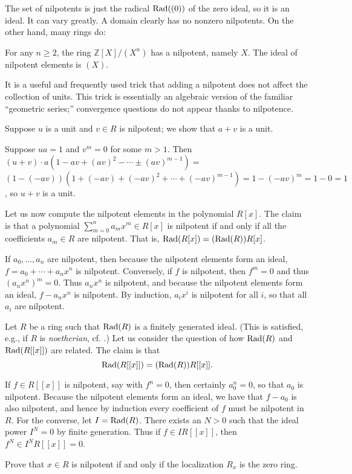 The set of nilpotents is just the radical $\operatorname{Rad}((0))$ of the zero ideal, so it
is an ideal. It can vary greatly. 
A domain clearly has no nonzero nilpotents. On the other hand, many rings do:

\begin{example} 
For any $n \geq 2$, the ring $\mathbb{Z}[X]/(X^n)$ has a nilpotent, namely $X$.
The ideal of nilpotent elements is $(X)$.
\end{example} 

It is a useful and frequently used trick that adding a nilpotent does not affect
the collection of units. This trick is essentially an algebraic version of the
familiar ``geometric series;'' convergence questions do not appear thanks to
nilpotence. 

\begin{example} 
Suppose $u$ is a unit and $v \in R$ is nilpotent; we show that $a+v$ is a unit.

Suppose $ua=1$ and $v^m=0$ for some
$m>1$. Then  $(u+v)\cdot a(1-av+(av)^2-\cdots\pm(av)^{m-1})=$
$(1-(-av))(1+(-av)+(-av)^2+\cdots+(-av)^{m-1})=1-(-av)^m=1-0=1$, so $u+v$
is a unit.
\end{example} 

\begin{example}
Let us now compute the nilpotent elements in the polynomial $R[x]$.
The claim is that a polynomial $\sum_{m=0}^n a_m x^m \in R[x]$ is nilpotent if and only
if all the coefficients $a_m \in R$ are nilpotent. That is, $\operatorname{Rad}(R[x]) =
(\operatorname{Rad}(R))R[x]$.

If $a_0,\ldots,a_n$ are nilpotent, then because the nilpotent
elements form an ideal, $f=a_0+\cdots+a_nx^n$ is nilpotent. Conversely,
if $f$ is nilpotent, then $f^m=0$ and thus $(a_nx^n)^m=0$. Thus $a_nx^n$
is nilpotent, and because the nilpotent elements form an ideal, $f-a_nx^n$
is nilpotent. By induction, $a_ix^i$ is nilpotent for all $i$, so that all
$a_i$ are nilpotent.
\end{example} 


\begin{example}
Let $R$ be  a ring such that $\operatorname{Rad}(R)$ is a finitely generated ideal. (This is
satisfied, e.g., if $R$ is \emph{noetherian}, cf. .)
Let us consider the question of how $\operatorname{Rad}(R)$ and $\operatorname{Rad}(R[[x]])$ are related.
The claim is that
\[ \operatorname{Rad}(R[[x]]) = (\operatorname{Rad}(R))R[[x]].  \]

If $f\in R[[x]]$ is nilpotent, say with $f^n=0$, then
certainly $a_0^n=0$, so that $a_0$ is nilpotent. Because the nilpotent elements
form an ideal, we have that $f-a_0$ is also nilpotent, and hence by induction
every coefficient of $f$ must be nilpotent in $R$. 
For the converse, let $I =
\operatorname{Rad}(R)$. There
exists an $N>0$ such that the ideal power $I^N  = 0$ by finite generation. 
Thus if $f \in IR[[x]]$, then $f^N \in I^N R[[x]] = 0$.
\end{example} 
\begin{exercise} \label{nilpcriterion} 
Prove that $x \in R$ is nilpotent if and only if the localization $R_x$ is the
zero ring.
\end{exercise} 

